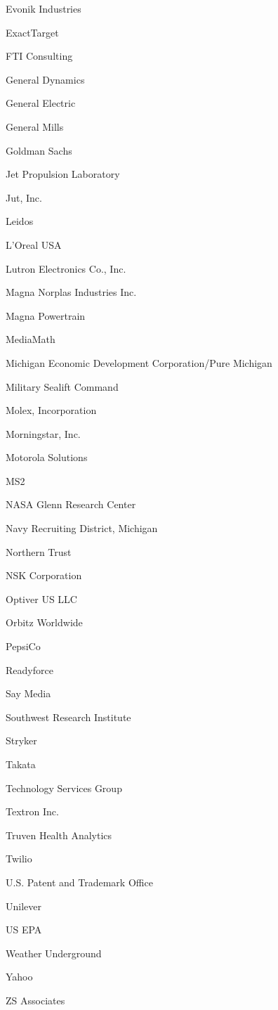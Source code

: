 \documentclass[twoside]{article}
\begin{document}
\begin{center}
\begin{multicols}{5}
\begin{FlushLeft}
\begin{compactitem}
\item Evonik Industries
\item ExactTarget
\item FTI Consulting
\item General Dynamics
\item General Electric
\item General Mills
\item Goldman Sachs
\item Jet Propulsion Laboratory
\item Jut, Inc.
\item Leidos
\item L'Oreal USA
\item Lutron Electronics Co., Inc.
\item Magna Norplas Industries Inc.
\item Magna Powertrain
\item MediaMath
\item Michigan Economic Development Corporation/Pure Michigan
\item Military Sealift Command
\item Molex, Incorporation
\item Morningstar, Inc.
\item Motorola Solutions
\item MS2
\item NASA Glenn Research Center
\item Navy Recruiting District, Michigan
\item Northern Trust
\item NSK Corporation
\item Optiver US LLC
\item Orbitz Worldwide
\item PepsiCo
\item Readyforce
\item Say Media
\item Southwest Research Institute
\item Stryker
\item Takata
\item Technology Services Group
\item Textron Inc.
\item Truven Health Analytics
\item Twilio
\item U.S. Patent and Trademark Office
\item Unilever
\item US EPA
\item Weather Underground
\item Yahoo
\item ZS Associates
\end{compactitem}
        \end{FlushLeft}
        \vspace{1em}
        \end{multicols}\end{center}
\end{document}
